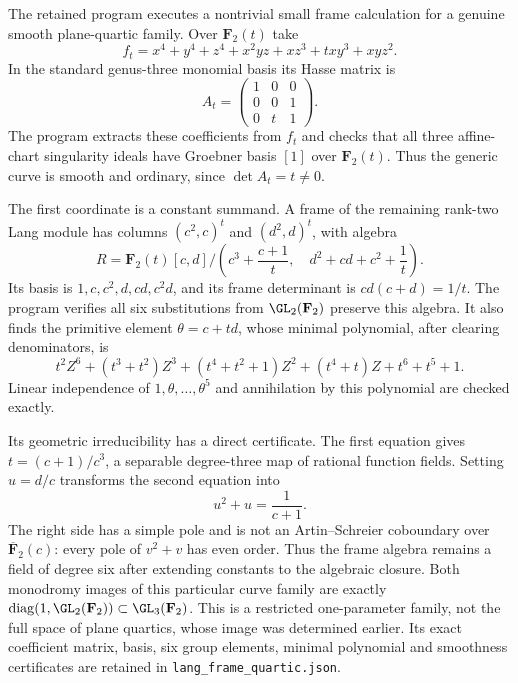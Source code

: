 \begin{example}\label{ex:effective-quartic-frame-algebra}
The retained program 
executes a nontrivial small frame calculation for a genuine
smooth plane-quartic family.  Over $\mathbf F_2(t)$ take
\[
 f_t=x^4+y^4+z^4+x^2yz+xz^3+txy^3+xyz^2.
\]
In the standard genus-three monomial basis its Hasse matrix is
\[
 A_t=\begin{pmatrix}1&0&0\\0&0&1\\0&t&1\end{pmatrix}.
\]
The program extracts these coefficients from $f_t$ and checks
that all three affine-chart singularity ideals have Groebner
basis $[1]$ over $\mathbf F_2(t)$.
Thus the generic curve is smooth and ordinary, since
$\det A_t=t\ne0$.

The first coordinate is a constant summand.  A frame of the
remaining rank-two Lang module has columns $(c^2,c)^t$ and
$(d^2,d)^t$, with algebra
\[
 R=\mathbf F_2(t)[c,d]/
 \left(c^3+\frac{c+1}{t},\quad
              d^2+cd+c^2+\frac1t\right).
\]
Its basis is $1,c,c^2,d,cd,c^2d$, and its frame determinant
is $cd(c+d)=1/t$.
The program verifies all six substitutions from
$\GL_2(\mathbf F_2)$ preserve this algebra.
It also finds the primitive element $\theta=c+td$,
whose minimal polynomial, after clearing denominators, is
\[
 t^2 Z^6+(t^3+t^2)Z^3+(t^4+t^2+1)Z^2
       +(t^4+t)Z+t^6+t^5+1.
\]
Linear independence of $1,\theta,\ldots,\theta^5$ and
annihilation by this polynomial are checked exactly.

Its geometric irreducibility has a direct certificate.
The first equation gives $t=(c+1)/c^3$, a separable
degree-three map of rational function fields.
Setting $u=d/c$ transforms the second equation into
\[
 u^2+u=\frac1{c+1}.
\]
The right side has a simple pole and is not an
Artin--Schreier coboundary over $\overline{\mathbf F}_2(c)$:
every pole of $v^2+v$ has even order.
Thus the frame algebra remains a field of degree six
after extending constants to the algebraic closure.
Both monodromy images of this particular curve family
are exactly
$\operatorname{diag}(1,\GL_2(\mathbf F_2))\subset\GL_3(\mathbf F_2)$.
This is a restricted one-parameter family, not the full
space of plane quartics, whose image was determined
earlier.  Its exact coefficient matrix, basis, six group
elements, minimal polynomial and smoothness certificates
are retained in \texttt{lang\_frame\_quartic.json}.
\end{example}


